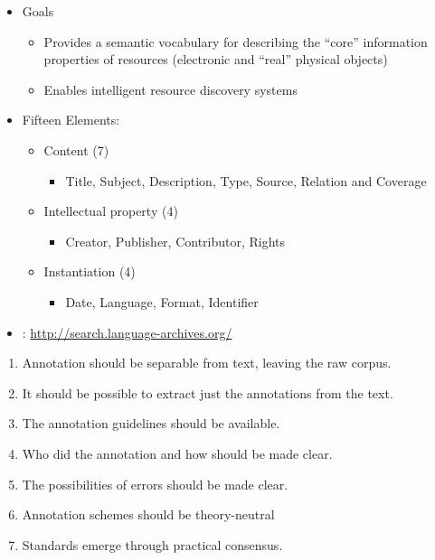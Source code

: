 \documentclass[a4paper,landscape,headrule,footrule,dvips]{foils}
\begin{document}
\begin{CJK}{UTF8}{min}
\begin{itemize}
\item Goals
  \begin{itemize}
  \item Provides a semantic vocabulary for describing the
    ``core'' information properties of resources (electronic
    and ``real'' physical objects)
  \item Enables intelligent resource discovery systems
  \end{itemize}
\item Fifteen Elements:
  \begin{itemize}
  \item Content (7)
    \begin{itemize}
    \item Title, Subject, Description, Type, Source,
      Relation and Coverage
    \end{itemize}
  \item Intellectual property (4)
    \begin{itemize}
    \item Creator, Publisher, Contributor, Rights
    \end{itemize}
  \item Instantiation (4)
    \begin{itemize}
    \item Date, Language, Format, Identifier
    \end{itemize}
  \end{itemize}
\item {}: {\small \url{http://search.language-archives.org/}}
\end{itemize}



\MyLogo{}
\begin{enumerate}
\item Annotation should be separable from text, leaving the raw corpus.
\item It should be possible to extract just the annotations
from the text. 
\item The annotation guidelines should be available.
\item Who did the annotation and how should be made clear.
\item The possibilities of errors should be made clear.
\item Annotation schemes should be theory-neutral 
\item Standards emerge through practical consensus.
\end{enumerate}


\end{CJK}
\end{document}
